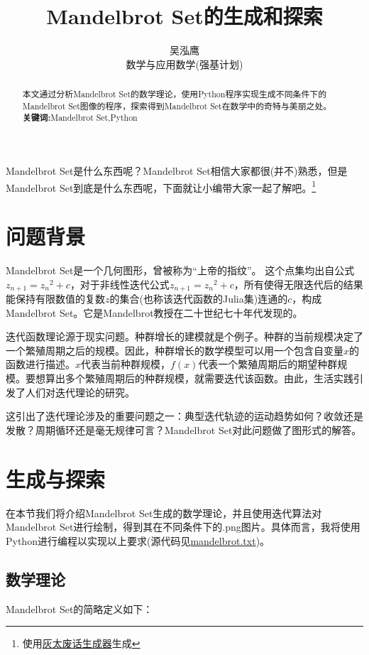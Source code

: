\documentclass[a4paper]{ctexart}
\author{吴泓鹰\\数学与应用数学(强基计划)\quad3210101890}
\title{Mandelbrot Set的生成和探索}
\begin{document}
\maketitle	

\begin{abstract}
	本文通过分析Mandelbrot Set的数学理论，使用Python程序实现生成不同条件下的Mandelbrot Set图像的程序，探索得到Mandelbrot Set在数学中的奇特与美丽之处。\\
	\textbf{关键词:}Mandelbrot Set,Python
\end{abstract}	

Mandelbrot Set是什么东西呢？Mandelbrot Set相信大家都很(并不)熟悉，但是Mandelbrot Set到底是什么东西呢，下面就让小编带大家一起了解吧。\footnote{使用\href{https://www.pslkzs.com/feihua/feihua.php}{灰太废话生成器}生成}

\section{问题背景}
Mandelbrot Set是一个几何图形，曾被称为“上帝的指纹”。 这个点集均出自公式$z_{n+1}={z_n}^2+c$，对于非线性迭代公式$z_{n+1}={z_n}^2+c$，所有使得无限迭代后的结果能保持有限数值的复数$z$的集合(也称该迭代函数的Julia集)连通的$c$，构成Mandelbrot Set。它是Mandelbrot教授在二十世纪七十年代发现的。\cite{mandelbrotsetbaidu}

迭代函数理论源于现实问题。种群增长的建模就是个例子。种群的当前规模决定了一个繁殖周期之后的规模。因此，种群增长的数学模型可以用一个包含自变量$x$的函数进行描述。$x$代表当前种群规模，$f(x)$代表一个繁殖周期后的期望种群规模。要想算出多个繁殖周期后的种群规模，就需要迭代该函数。由此，生活实践引发了人们对迭代理论的研究。

这引出了迭代理论涉及的重要问题之一：典型迭代轨迹的运动趋势如何？收敛还是发散？周期循环还是毫无规律可言？Mandelbrot Set对此问题做了图形式的解答。\cite{mandelbrotsetzhihu}

\section{生成与探索}
在本节我们将介绍Mandelbrot Set生成的数学理论，并且使用迭代算法对Mandelbrot Set进行绘制，得到其在不同条件下的.png图片。具体而言，我将使用Python进行编程以实现以上要求(源代码见\href{run:./code/py/mandelbrot.txt}{mandelbrot.txt})\cite{mandelbrotsetpython}。

\subsection{数学理论}
Mandelbrot Set的简略定义如下：
\end{document}
